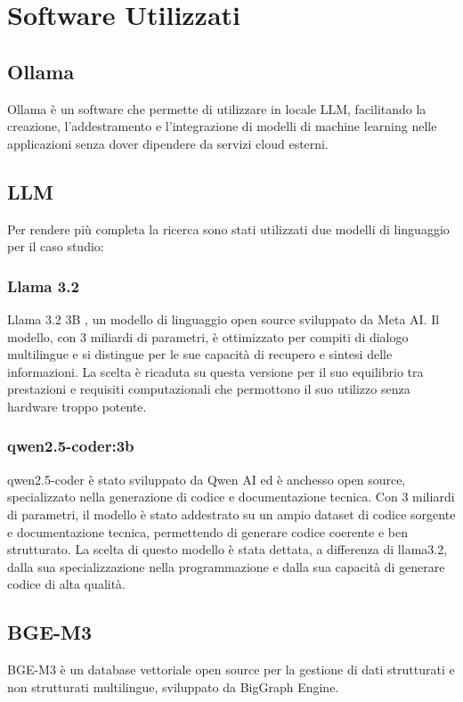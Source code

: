 \documentclass[12pt,a4paper,openright,twoside]{book}
\begin{document}
\section{Software Utilizzati}
\subsection{Ollama}
Ollama \cite{ollama-docs} è un software che permette di utilizzare in locale LLM, facilitando la creazione, l'addestramento e l'integrazione di modelli di machine learning nelle applicazioni senza dover dipendere da servizi cloud esterni.
\subsection{LLM}
Per rendere più completa la ricerca sono stati utilizzati due modelli di linguaggio per il caso studio:
\subsubsection{Llama 3.2}
Llama 3.2 3B \cite{llama3-2}, un modello di linguaggio open source sviluppato da Meta AI.
Il modello, con 3 miliardi di parametri, è ottimizzato per compiti di dialogo multilingue e si distingue per le sue capacità di recupero e sintesi delle informazioni.
La scelta è ricaduta su questa versione per il suo equilibrio tra prestazioni e requisiti computazionali che permottono il suo utilizzo senza hardware troppo potente.

\subsubsection{qwen2.5-coder:3b}
qwen2.5-coder \cite{qwen-coder} è stato sviluppato da Qwen AI ed è anchesso open source, specializzato nella generazione di codice e documentazione tecnica.
Con 3 miliardi di parametri, il modello è stato addestrato su un ampio dataset di codice sorgente e documentazione tecnica, permettendo di generare codice coerente e ben strutturato. 
La scelta di questo modello è stata dettata, a differenza di llama3.2, dalla sua specializzazione nella programmazione e dalla sua capacità di generare codice di alta qualità.

\subsection{BGE-M3}
BGE-M3 \cite{bge-m3} è un database vettoriale open source per la gestione di dati strutturati e non strutturati multilingue, sviluppato da BigGraph Engine.
\end{document}
